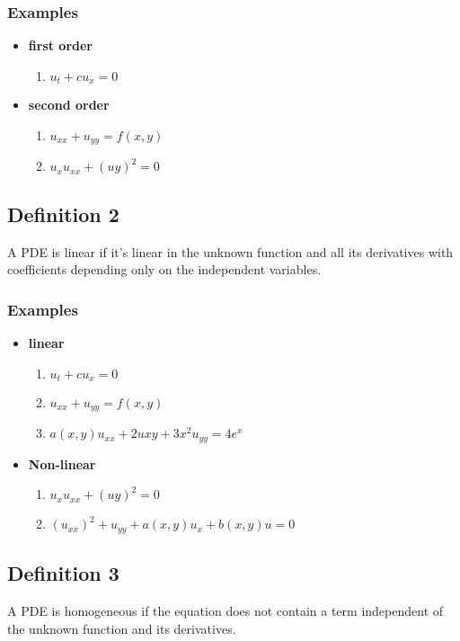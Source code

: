 \documentclass[12 pt]{article}
\begin{document}
 \subsubsection*{Examples}
 \begin{itemize}
     \item \textbf{first order}\begin{enumerate}
         \item $u_t +c u_x=0$
     \end{enumerate}
         
     \item \textbf{second order}\begin{enumerate}
         \item $u_{xx}+u_{yy}=f(x,y)$
         \item $u_xu_{xx}+(u{y})^2=0$
     \end{enumerate}
 \end{itemize}
\subsection{Definition 2}
A PDE is linear if it's linear in the unknown function and all its derivatives with coefficients depending only on the independent variables.
\subsubsection*{Examples}
\begin{itemize}
     \item \textbf{linear}\begin{enumerate}
         \item $u_t +c u_x=0$
          \item $u_{xx}+u_{yy}=f(x,y)$
          \item $a(x,y)u_{xx}+2u{xy}+3x^2u_{yy}=4e^x$
     \end{enumerate}
     \item \textbf{Non-linear}\begin{enumerate}
         \item $u_xu_{xx}+(u{y})^2=0$
         \item $(u_{xx})^2+u_{yy}+a(x,y)u_x+b(x,y)u=0$
     \end{enumerate}
 \end{itemize}
 \subsection{Definition 3}
 A PDE is homogeneous if the equation does not contain a term independent of the unknown function
and its derivatives.
\end{document}
